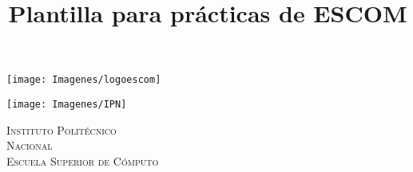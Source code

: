 \documentclass[10pt]{article}
\title{Plantilla para prácticas de ESCOM}
\begin{document}
\begin{center}																		%
\newcommand{\HRule}{\rule{\linewidth}{0.5mm}}									%
\begin{minipage}{0.48\textwidth} \begin{flushleft}
\texttt{[image: Imagenes/logoescom]}
\end{flushleft}\end{minipage}
\begin{minipage}{0.48\textwidth} \begin{flushright}
\texttt{[image: Imagenes/IPN]}
\end{flushright}\end{minipage}

\vspace*{-1.5cm}								%
\textsc{\huge Instituto Polit\'ecnico\\ \vspace{5px} Nacional}\\[1.5cm]	

\textsc{\LARGE Escuela Superior de Cómputo}\\[1.5cm]													%


\end{center}
\end{document}
